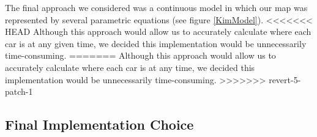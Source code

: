 \documentclass[11pt]{article}
\begin{document}
	The final approach we considered was a continuous model in which our map was represented by several parametric equations (see figure \ref{KimModel}). 
<<<<<<< HEAD
	Although this approach would allow us to accurately calculate where each car is at any given time, we decided this implementation would be unnecessarily time-consuming.  
=======
	Although this approach would allow us to accurately calculate where each car is at any time, we decided this implementation would be unnecessarily time-consuming.  
>>>>>>> revert-5-patch-1
	

\subsection{Final Implementation Choice}

	
	
	
\end{document}
